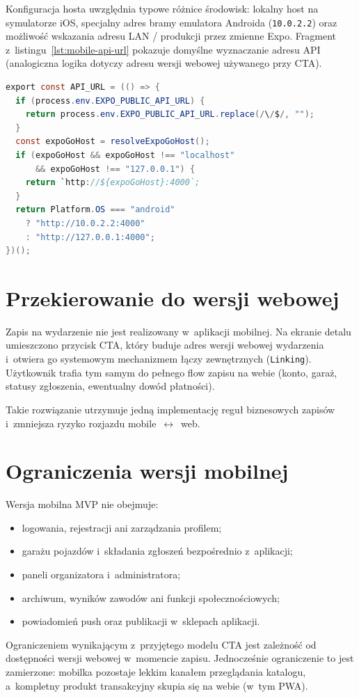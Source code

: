 \documentclass{sprz}
\begin{document}
Konfiguracja hosta uwzględnia typowe różnice środowisk: lokalny host na symulatorze iOS, specjalny adres bramy emulatora Androida (\texttt{10.0.2.2}) oraz możliwość wskazania adresu LAN / produkcji przez zmienne Expo. Fragment z~listingu~\ref{lst:mobile-api-url} pokazuje domyślne wyznaczanie adresu API (analogiczna logika dotyczy adresu wersji webowej używanego przy CTA).

\begin{lstlisting}[language=Java,caption={Wyznaczanie bazowego adresu API dla klienta mobilnego},label={lst:mobile-api-url}]
export const API_URL = (() => {
  if (process.env.EXPO_PUBLIC_API_URL) {
    return process.env.EXPO_PUBLIC_API_URL.replace(/\/$/, "");
  }
  const expoGoHost = resolveExpoGoHost();
  if (expoGoHost && expoGoHost !== "localhost"
      && expoGoHost !== "127.0.0.1") {
    return `http://${expoGoHost}:4000`;
  }
  return Platform.OS === "android"
    ? "http://10.0.2.2:4000"
    : "http://127.0.0.1:4000";
})();
\end{lstlisting}

\section{Przekierowanie do wersji webowej}
Zapis na wydarzenie nie jest realizowany w~aplikacji mobilnej. Na ekranie detalu umieszczono przycisk CTA, który buduje adres wersji webowej wydarzenia i~otwiera go systemowym mechanizmem łączy zewnętrznych (\texttt{Linking}). Użytkownik trafia tym samym do pełnego flow zapisu na webie (konto, garaż, statusy zgłoszenia, ewentualny dowód płatności).

Takie rozwiązanie utrzymuje jedną implementację reguł biznesowych zapisów i~zmniejsza ryzyko rozjazdu mobile~$\leftrightarrow$~web.

\section{Ograniczenia wersji mobilnej}
Wersja mobilna MVP nie obejmuje:
\begin{itemize}
  \item logowania, rejestracji ani zarządzania profilem;
  \item garażu pojazdów i~składania zgłoszeń bezpośrednio z~aplikacji;
  \item paneli organizatora i~administratora;
  \item archiwum, wyników zawodów ani funkcji społecznościowych;
  \item powiadomień push oraz publikacji w~sklepach aplikacji.
\end{itemize}
Ograniczeniem wynikającym z~przyjętego modelu CTA jest zależność od dostępności wersji webowej w~momencie zapisu. Jednocześnie ograniczenie to jest zamierzone: mobilka pozostaje lekkim kanałem przeglądania katalogu, a~kompletny produkt transakcyjny skupia się na webie (w~tym PWA).
\end{document}
